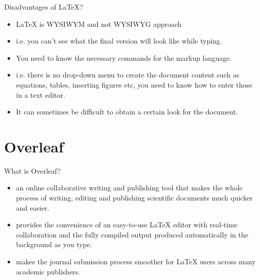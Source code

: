 \documentclass[style=njit,orient=landscape]{powerdot}
\begin{document}
\begin{slide}[bm={Disadvantages of \LaTeX{}?}]{Disadvantages of \LaTeX{}?}
  \begin{itemize}
  \item \LaTeX{} is WYSIWYM and not WYSIWYG approach
  \item[] i.e. you can't see what the final version will look like while typing.
  \item You need to know the necessary commands for the markup language.
  \item[] i.e. there is no drop-down menu to create the document content such as equations, tables, inserting figures etc, you need to know how to enter those in a text editor.
  \item It can sometimes be difficult to obtain a certain look for the document.
  \end{itemize}
\end{slide}

\section[slide=false]{Overleaf}
\begin{slide}{What is Overleaf?}
 \begin{itemize}
  \item an online collaborative writing and publishing tool that makes the whole process of writing, editing and publishing scientific documents much quicker and easier. 
  \item provides the convenience of an easy-to-use \LaTeX{} editor with real-time collaboration and the fully compiled output produced automatically in the background as you type.
  \item makes the journal submission process smoother for \LaTeX{} users across many academic publishers.
 \end{itemize}
\end{slide}
\end{document}
